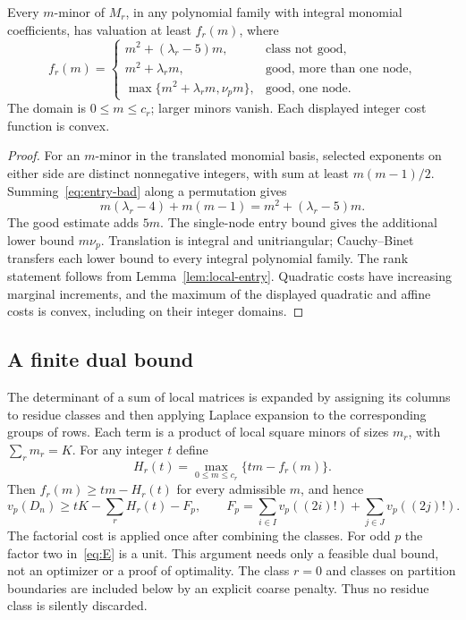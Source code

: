 \begin{lemma}\label{lem:local-minor}
Every $m$-minor of $M_r$, in any polynomial family with integral
monomial coefficients, has valuation at least $f_r(m)$, where
\begin{equation}\label{eq:costs}
 f_r(m)=
 \begin{cases}
 m^2+(\lambda_r-5)m,&\text{class not good},\\
 m^2+\lambda_rm,&\text{good, more than one node},\\
 \max\{m^2+\lambda_rm,\nu_pm\},&\text{good, one node}.
 \end{cases}
\end{equation}
The domain is $0\le m\le c_r$; larger minors vanish.
Each displayed integer cost function is convex.
\end{lemma}
\begin{proof}
For an $m$-minor in the translated monomial basis, selected exponents
on either side are distinct nonnegative integers, with sum at least
$m(m-1)/2$.  Summing~\eqref{eq:entry-bad} along a permutation gives
\[
 m(\lambda_r-4)+m(m-1)=m^2+(\lambda_r-5)m.
\]
The good estimate adds $5m$.  The single-node entry bound gives the
additional lower bound $m\nu_p$.  Translation is integral and
unitriangular; Cauchy--Binet transfers each lower bound to every
integral polynomial family.  The rank statement follows from
Lemma~\ref{lem:local-entry}.  Quadratic costs have increasing marginal
increments, and the maximum of the displayed quadratic and affine
costs is convex, including on their integer domains.
\end{proof}

\subsection{A finite dual bound}
The determinant of a sum of local matrices is expanded by assigning its
columns to residue classes and then applying Laplace expansion to the
corresponding groups of rows. Each term is a product of local square minors
of sizes $m_r$, with $\sum_r m_r=K$. For any integer $t$ define
\[
 H_r(t)=\max_{0\le m\le c_r}\{tm-f_r(m)\}.
\]
Then $f_r(m)\ge tm-H_r(t)$ for every admissible $m$, and hence
\begin{equation}\label{eq:dual}
 v_p(D_n)\ge tK-\sum_r H_r(t)-F_p,\qquad
 F_p=\sum_{i\in I}v_p((2i)!)+\sum_{j\in J}v_p((2j)!).
\end{equation}
The factorial cost is applied once after combining the classes. For odd
$p$ the factor two in~\eqref{eq:E} is a unit. This argument needs only a
feasible dual bound, not an optimizer or a proof of optimality.
The class $r=0$ and classes on partition boundaries are included below by
an explicit coarse penalty. Thus no residue class is silently discarded.

